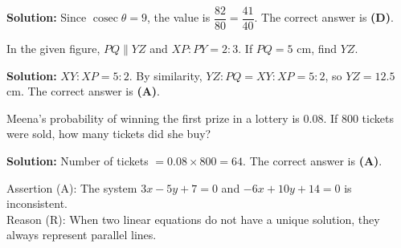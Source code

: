 \documentclass[journal]{IEEEtran}
\begin{document}
\begin{list}{}{\setlength{\leftmargin}{1.15cm}\setlength{\labelwidth}{1.0cm}\setlength{\labelsep}{0.15cm}\setlength{\itemindent}{0pt}\setlength{\listparindent}{0pt}\setlength{\parsep}{0pt}\setlength{\topsep}{0pt}}
\begin{list}{}{\setlength{\leftmargin}{1.15cm}\setlength{\labelwidth}{1.0cm}\setlength{\labelsep}{0.15cm}\setlength{\itemindent}{0pt}\setlength{\listparindent}{0pt}\setlength{\parsep}{0pt}\setlength{\topsep}{0pt}}
\vspace{0.7em}\par\noindent\textbf{Solution:} Since $\operatorname{cosec}\theta=9$, the value is $\dfrac{82}{80}=\dfrac{41}{40}$. The correct answer is \textbf{(D)}.
\end{list}
\vspace{1.2em}
\begin{list}{}{\setlength{\leftmargin}{1.15cm}\setlength{\labelwidth}{1.0cm}\setlength{\labelsep}{0.15cm}\setlength{\itemindent}{0pt}\setlength{\listparindent}{0pt}\setlength{\parsep}{0pt}\setlength{\topsep}{0pt}}
\item[5.1.15] In the given figure, $PQ\parallel YZ$ and $XP:PY=2:3$. If $PQ=5$ cm, find $YZ$.

\vspace{0.7em}\par\noindent\textbf{Solution:} $XY:XP=5:2$. By similarity, $YZ:PQ=XY:XP=5:2$, so $YZ=12.5$ cm. The correct answer is \textbf{(A)}.
\end{list}
\vspace{1.2em}
\begin{list}{}{\setlength{\leftmargin}{1.15cm}\setlength{\labelwidth}{1.0cm}\setlength{\labelsep}{0.15cm}\setlength{\itemindent}{0pt}\setlength{\listparindent}{0pt}\setlength{\parsep}{0pt}\setlength{\topsep}{0pt}}
\item[5.1.16] Meena's probability of winning the first prize in a lottery is $0.08$. If 800 tickets were sold, how many tickets did she buy?

\vspace{0.7em}\par\noindent\textbf{Solution:} Number of tickets $=0.08\times800=64$. The correct answer is \textbf{(A)}.
\end{list}
\vspace{1.2em}
\begin{list}{}{\setlength{\leftmargin}{1.15cm}\setlength{\labelwidth}{1.0cm}\setlength{\labelsep}{0.15cm}\setlength{\itemindent}{0pt}\setlength{\listparindent}{0pt}\setlength{\parsep}{0pt}\setlength{\topsep}{0pt}}
\item[5.1.19] Assertion (A): The system $3x-5y+7=0$ and $-6x+10y+14=0$ is inconsistent.\\
Reason (R): When two linear equations do not have a unique solution, they always represent parallel lines.


\end{list}
\end{list}
\end{document}
